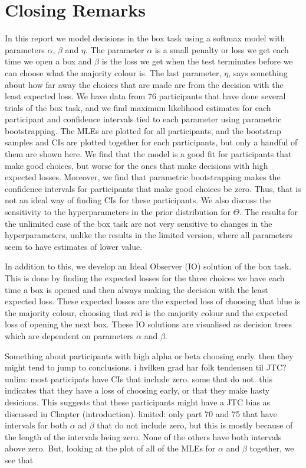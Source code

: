 \chapter{Closing Remarks}
In this report we model decisions in the box task using a softmax model with parameters $\alpha$, $\beta$ and $\eta$. The parameter $\alpha$ is a small penalty or loss we get each time we open a box and $\beta$ is the loss we get when the test terminates before we can choose what the majority colour is. The last parameter, $\eta$, says something about how far away the choices that are made are from the decision with the least expected loss.
We have data from 76 participants that have done several trials of the box task, and we find maximum likelihood estimates for each participant and confidence intervals tied to each parameter using parametric bootstrapping. The MLEs are plotted for all participants, and the bootstrap samples and CIs are plotted together for each participants, but only a handful of them are shown here. 
We find that the model is a good fit for participants that make good choices, but worse for the ones that make decisions with high expected losses. Moreover, we find that parametric bootstrapping makes the confidence intervals for participants that make good choices be zero. Thus, that is not an ideal way of finding CIs for these participants.
We also discuss the sensitivity to the hyperparameters in the prior distribution for $\Theta$. The results for the unlimited case of the box task are not very sensitive to changes in the hyperparameters, unlike the results in the limited version, where all parameters seem to have estimates of lower value. 


In addition to this, we develop an Ideal Observer (IO) solution of the box task. This is done by finding the expected losses for the three choices we have each time a box is opened and then always making the decision with the least expected loss. These expected losses are the expected loss of choosing that blue is the majority colour, choosing that red is the majority colour and the expected loss of opening the next box. These IO solutions are visualised as decision trees which are dependent on parameters $\alpha$ and $\beta$.

Something about participants with high alpha or beta choosing early. then they might tend to jump to conclusions. i hvilken grad har folk tendensen til JTC? 
unlim: most participats have CIs that include zero. some that do not. this indicates that they have a loss of choosing early, or that they make hasty desicions. This suggests that these participants might have a JTC bias as discussed in Chapter (introduction). 
limited: only part 70 and 75 that have intervals for both $\alpha$ ad $\beta$ that do not include zero, but this is mostly because of the length of the intervals being zero. None of the others have both intervals above zero. But, looking at the plot of all of the MLEs for $\alpha$ and $\beta$ together, we see that


